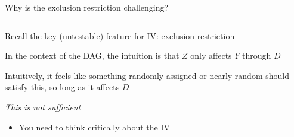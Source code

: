 \documentclass[notes,11pt, aspectratio=169]{beamer}
\newenvironment{wideitemize}{\itemize\addtolength{\itemsep}{10pt}}{\enditemize}
\begin{document}
\begin{frame}{Why is the exclusion restriction challenging?}
  \begin{columns}[T] %
    \begin{column}{0.6\textwidth}
      \begin{wideitemize}
      \item Recall the key (untestable) feature for IV: exclusion
        restriction
      \item In the context of the DAG, the intuition is that $Z$ only
        affects $Y$ through $D$
      \item Intuitively, it feels like something randomly assigned or
        nearly random should satisfy this, so long as it affects $D$
      \item \emph{This is not sufficient }
        \begin{itemize}
        \item You need to think critically about the IV
        \end{itemize}
  \end{wideitemize}
\end{column}
\begin{column}{0.4\textwidth}
  \begin{center}
      \end{center}
\end{column}
\end{columns}
\end{frame}
\end{document}
